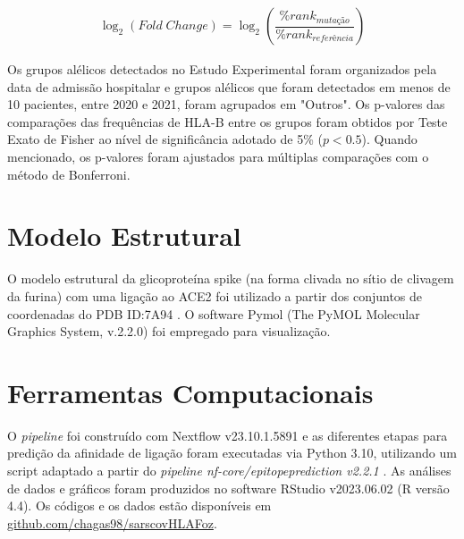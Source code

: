 \begin{justify}
\begin{subequations}
\begin{gather}
\log_2(Fold\;Change) = \log_2(\dfrac{\%rank_{mutação}}{\%rank_{referência}})   \label{eq:fc} 

\end{gather}
\end{subequations}


Os grupos alélicos detectados no Estudo Experimental foram organizados pela data de admissão hospitalar e grupos alélicos que foram detectados em menos de 10 pacientes, entre 2020 e 2021, foram agrupados em "Outros". Os p-valores das comparações das frequências de HLA-B entre os grupos foram obtidos por Teste Exato de Fisher ao nível de significância adotado de 5\% (\( p < 0.5 \)). Quando mencionado, os p-valores foram ajustados para múltiplas comparações com o método de Bonferroni. 

\section{Modelo Estrutural}

O modelo estrutural da glicoproteína spike (na forma clivada no sítio de clivagem da furina) com uma ligação ao ACE2 foi utilizado a partir dos conjuntos de coordenadas do PDB ID:7A94 \cite{Benton:2020}. O software Pymol (The PyMOL Molecular Graphics System, v.2.2.0) foi empregado para visualização.

\section{Ferramentas Computacionais}

O \textit{pipeline} foi construído com Nextflow v23.10.1.5891 e as diferentes etapas para predição da afinidade de ligação foram executadas via Python 3.10, utilizando um script adaptado a partir do \textit{pipeline nf-core/epitopeprediction v2.2.1} \cite{Mohr:2024}.  As análises de dados e gráficos foram produzidos no software RStudio v2023.06.02 (R versão 4.4). Os códigos e os dados estão disponíveis em \href{https://github.com/chagas98/sarscovHLAFoz}{github.com/chagas98/sarscovHLAFoz}.

\end{justify}